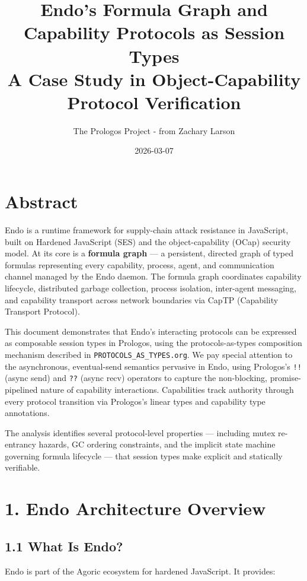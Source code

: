 \documentclass[11pt]{article}
\author{The Prologos Project - from Zachary Larson}
\date{2026-03-07}
\title{Endo's Formula Graph and Capability Protocols as Session Types\\\medskip
\large A Case Study in Object-Capability Protocol Verification}
\begin{document}
\maketitle
\tableofcontents

\section{Abstract}
\label{sec:org525c52b}

Endo is a runtime framework for supply-chain attack resistance in JavaScript,
built on Hardened JavaScript (SES) and the object-capability (OCap) security
model. At its core is a \textbf{formula graph} --- a persistent, directed graph of
typed formulas representing every capability, process, agent, and
communication channel managed by the Endo daemon. The formula graph
coordinates capability lifecycle, distributed garbage collection, process
isolation, inter-agent messaging, and capability transport across network
boundaries via CapTP (Capability Transport Protocol).

This document demonstrates that Endo's interacting protocols can be expressed
as composable session types in Prologos, using the protocols-as-types
composition mechanism described in \texttt{PROTOCOLS\_AS\_TYPES.org}. We pay special
attention to the asynchronous, eventual-send semantics pervasive in Endo,
using Prologos's \texttt{!!} (async send) and \texttt{??} (async recv) operators to
capture the non-blocking, promise-pipelined nature of capability interactions.
Capabilities track authority through every protocol transition via Prologos's
linear types and capability type annotations.

The analysis identifies several protocol-level properties --- including
mutex re-entrancy hazards, GC ordering constraints, and the implicit
state machine governing formula lifecycle --- that session types make
explicit and statically verifiable.
\section{1. Endo Architecture Overview}
\label{sec:orga5aa529}

\subsection{1.1 What Is Endo?}
\label{sec:org701fe6e}

Endo is part of the Agoric ecosystem for hardened JavaScript. It provides:
\end{document}
